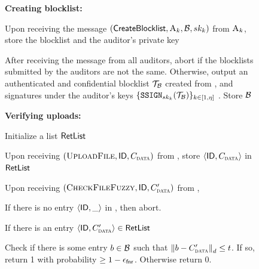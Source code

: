 \begin{figure}[h]
{\begin{minipage}[t]{0.45\textwidth}
		\smallskip\noindent\textbf{Creating blocklist:} 
		\enumListStart
		
	\item	Upon receiving the message $(\createBlocklist, \auditor[\auditorIdx], \blocklist, \privKey[\auditorIdx])$ from $\auditor[\auditorIdx]$, store the blocklist and the auditor's private key


		\item After receiving the \createBlocklist message from all auditors, abort if the blocklists submitted by the auditors are not the same. Otherwise, output an authenticated and confidential blocklist $\blklistToken$ created from \blocklist, and signatures under the auditor's keys $\{ \signGenSig[\auditorPrivKeyGenericScheme[\auditorIdx]](\blklistToken) \}_{\auditorIdx \in [1, \numAuditors]}$ . Store $\blocklist$

		\enumListEnd
		
		\smallskip\noindent\textbf{Verifying uploads:} 
		
	
	


		
		\enumListStartResume
		\item Initialize a list $\mathsf{RetList}$ 
		\item Upon receiving $(\uploadFile, \genericFileID, \clientMeta)$ from \client, store $\langle \genericFileID, \clientMeta \rangle$ in $\mathsf{RetList}$  

	
	\item Upon receiving $(\checkContentFuzzy,  \genericFileID, \clientMeta')$ from \server, 
		\enumListStart
		\item If there is no entry $\langle \mathsf{ID}, \_ \rangle$ in \retList, then abort. 
		\item If there is an entry $\langle \genericFileID, \clientMeta' \rangle \in \retList$

				\itemListStart
		\item Check if there is some entry $\genericBlocklistElmt \in \blocklist$ such that $\distanceNotation[\distance][\genericBlocklistElmt][\clientMeta'] \le \threshold$. If so, return 1 with probability $\ge 1 - \epsilon_\mathsf{fnr}$. Otherwise return 0. 





\end{minipage}}
\end{figure}
